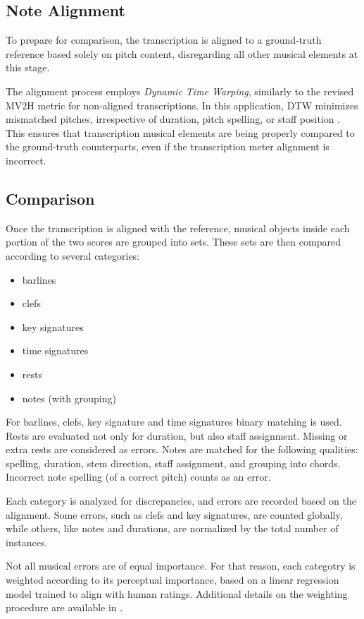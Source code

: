 \subsection{Note Alignment}

To prepare for comparison, the transcription is aligned to a ground-truth reference based solely on pitch content, disregarding all other musical elements at this stage.

The alignment process employs \emph{Dynamic Time Warping}, similarly to the revised MV2H metric for non-aligned transcriptions. In this application, DTW minimizes mismatched pitches, irrespective of duration, pitch spelling, or staff position \cite[p. 409]{Cogliati2016}. This ensures that transcription musical elements are being properly compared to the ground-truth counterparts, even if the transcription meter alignment is incorrect.

\subsection{Comparison}

Once the transcription is aligned with the reference, musical objects inside each portion of the two scores are grouped into sets. These sets are then compared according to several categories: \begin{itemize}
	\item barlines
	\item clefs
	\item key signatures
	\item time signatures
	\item rests
	\item notes (with grouping)
\end{itemize}

For barlines, clefs, key signature and time signatures binary matching is used. Rests are evaluated not only for duration, but also staff assignment. Missing or extra rests are considered as errors. Notes are matched for the following qualities: spelling, duration, stem direction, staff assignment, and grouping into chords. Incorrect note spelling (of a correct pitch) counts as an error.

Each category is analyzed for discrepancies, and errors are recorded based on the alignment. Some errors, such as clefs and key signatures, are counted globally, while others, like notes and durations, are normalized by the total number of instances.

Not all musical errors are of equal importance. For that reason, each categotry is weighted according to its perceptual importance, based on a linear regression model trained to align with human ratings. Additional details on the weighting procedure are available in \cite[p. 410--411]{Cogliati2017}.

